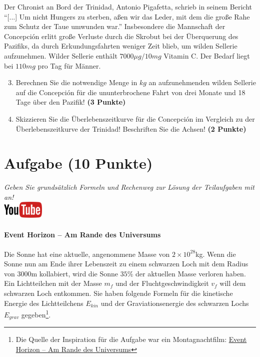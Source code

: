 \documentclass[a4paper, 9pt]{scrartcl}\usepackage[]{graphicx}\usepackage[]{xcolor}
\begin{document}
Der Chronist an Bord der Trinidad, Antonio Pigafetta, schrieb in seinem
Bericht "`[...] Um nicht Hungers zu sterben, a{\ss}en wir das Leder, mit dem
die gro{\ss}e Rahe zum Schutz der Taue umwunden war."' Insbesondere die
Mannschaft der Concepci{\'o}n erlitt gro{\ss}e Verluste durch die Skrobut bei der
{\"U}berquerung des Pazifiks, da durch Erkundungsfahrten weniger Zeit blieb, um
wilden Sellerie aufzunehmen. Wilder Sellerie enth{\"a}lt
$7000\mu g/10mg$ Vitamin C. Der Bedarf liegt bei
$110mg$ pro Tag f{\"u}r M{\"a}nner.

\begin{enumerate}
  \setcounter{enumi}{2}
\item Berechnen Sie die notwendige Menge in $kg$ an
  aufzunehmenden wilden Sellerie auf die Concepci{\'o}n f{\"u}r die ununterbrochene
  Fahrt von drei Monate und 18 Tage {\"u}ber den Pazifik!
  \textbf{(3 Punkte)}
\item Skizzieren Sie die {\"U}berlebenszeitkurve f{\"u}r die Concepci{\'o}n im
  Vergleich zu der {\"U}berlebenszeitkurve der Trinidad! Beschriften Sie die
  Achsen! \textbf{(2 Punkte)}
\end{enumerate}

 
\clearpage

\section{Aufgabe \hfill (10 Punkte)}

\textit{Geben Sie grunds{\"a}tzlich Formeln und Rechenweg zur L{\"o}sung der
  Teilaufgaben mit an!} \\[1Ex]

\hfill\href{https://youtu.be/q-qYK4Chslg}{\includegraphics[width =
  2cm]{img/youtube}} %
\hspace{2Ex}

\paragraph{Event Horizon -- Am Rande des Universums}



Die Sonne hat eine aktuelle, angenommene Masse von $\ensuremath{2\times 10^{28}}$kg. Wenn
die Sonne nun am Ende ihrer Lebenszeit zu einem schwarzen Loch mit dem
Radius von $3000$m kollabiert, wird die Sonne $35$\%
der aktuellen Masse verloren haben. Ein Lichtteilchen mit der Masse $m_f$
und der Fluchtgeschwindigkeit $v_f$ will dem schwarzen Loch entkommen.  Sie
haben folgende Formeln f{\"u}r die kinetische Energie des Lichtteilchens
$E_{kin}$ und der Graviationsenergie des schwarzen Lochs $E_{grav}$
gegeben\footnote{Die Quelle der Inspiration
  für die Aufgabe war ein Montagnachtfilm:
  \href{https://de.wikipedia.org/wiki/Event_Horizon_–_Am_Rande_des_Universums}{Event Horizon – Am Rande des Universums}}.
\end{document}

